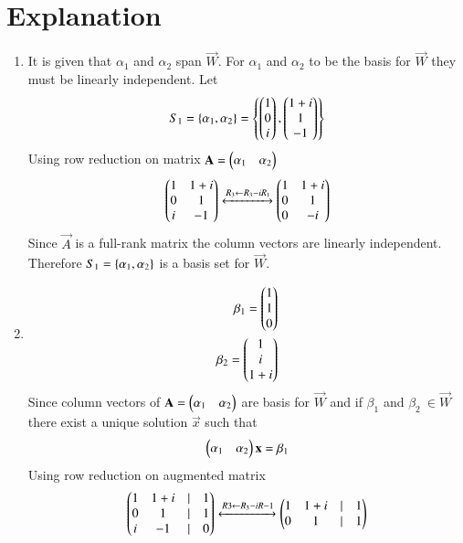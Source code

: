 \documentclass[journal,12pt,twocolumn]{IEEEtran}
\begin{document}
\section{Explanation}
\begin{enumerate}[label=\emph{\alph*)}]
\item 
It is given that $\alpha_1$ and $\alpha_2$ span $\vec{W}$. For $\alpha_1$ and
$\alpha_2$ to be the basis for $\vec{W}$ they must be linearly independent.
Let
\begin{align}
	S_1=\left\{\alpha_1,\alpha_2\right\}=\left\{\begin{pmatrix}1\\0\\i\end{pmatrix},\begin{pmatrix}1+i\\1\\-1\end{pmatrix}\right\}
\end{align}
Using row reduction on matrix $\mathbf{A}=\begin{pmatrix}\alpha_1 & \alpha_2\end{pmatrix}$
\begin{align}
	\myvec{1 & 1+i \\ 0 & 1 \\ i & -1}
	\xleftrightarrow[]{R_3 \leftarrow R_3-iR_1}
	\myvec{1 & 1+i \\ 0 & 1 \\ 0 & -i}   \label{rrefA}
\end{align}
Since $\vec{A}$ is a full-rank matrix the column vectors are linearly 
independent. Therefore $S_1= \left\{ \alpha_1, \alpha_2 \right\} $ is a basis set for 
$\vec{W}$.
\item
\begin{align}
	\beta_1=\begin{pmatrix}1\\1\\0\end{pmatrix} \\
	\beta_2=\begin{pmatrix}1\\i\\1+i\end{pmatrix} 
\end{align}
		Since column vectors of $\mathbf{A}=\begin{pmatrix}\alpha_1 & \alpha_2\end{pmatrix}$ are basis for $\vec{W}$ and if $\beta_1$ and $\beta_2 \ \in \vec{W}$ there exist a unique solution $\vec{x}$ such that
\begin{align}
	\begin{pmatrix}\alpha_1 & \alpha_2\end{pmatrix}\mathbf{x}=\beta_1 
\end{align}
Using row reduction on augmented matrix
		\begin{align}
			\begin{pmatrix}1 & 1+i & | & 1 \\
			       0 & 1   & | & 1 \\
			       i & -1  & | & 0\end{pmatrix}
			\xleftrightarrow[]{R3 \leftarrow R_3-iR-1}
			\begin{pmatrix}1 & 1+i & | & 1 \\
			       0 & 1   & | & 1 \\
\end{pmatrix}
\end{align}
\end{enumerate}
\end{document}
